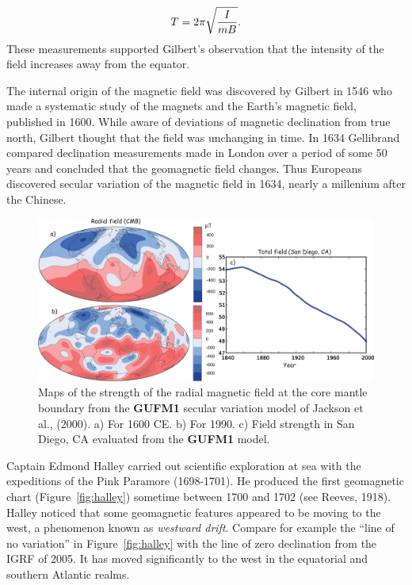 $$
T = 2 \pi  \sqrt {{ I \over {mB} }}.
$$
 \noindent
These measurements supported Gilbert's observation that the intensity of the field increases away from the equator.  

The internal origin of the magnetic field was discovered by Gilbert in 1546 who made a systematic study of the magnets and the Earth's magnetic field, published in 1600.   While aware of deviations of magnetic declination from true north, Gilbert thought that the field was unchanging in time.  In 1634  Gellibrand  compared declination measurements made in London over a period of some 50 years and concluded that the geomagnetic field changes.  Thus Europeans discovered secular variation of the magnetic field in 1634, nearly a millenium after the Chinese.  


\begin{figure}[h!tb]
\centering  \includegraphics[width=14 cm]{EPSfiles/gufm1.eps}
\caption{Maps of the strength of the radial magnetic field at the core mantle boundary from the {\bf GUFM1} secular variation model of  Jackson et al., (2000).  a) For 1600 CE.  b) For  1990.   c) Field strength in  San Diego, CA evaluated from the {\bf GUFM1} model.}  
\label{fig:gufm1}
\end{figure}  


Captain 
%
Edmond Halley  carried out  scientific exploration at sea with the expeditions of the Pink Paramore (1698-1701).  He produced the first geomagnetic chart (Figure~\ref{fig:halley}) sometime between 1700 and 1702 (see Reeves, 1918).   \nocite{reeves18}  Halley noticed that some geomagnetic features appeared to be moving to the west, a phenomenon known as {\it westward drift}.  Compare for example the ``line of no variation'' in Figure~\ref{fig:halley} with the line of zero declination from the IGRF of 2005.  It has moved significantly to the west in the equatorial and southern Atlantic realms.  


